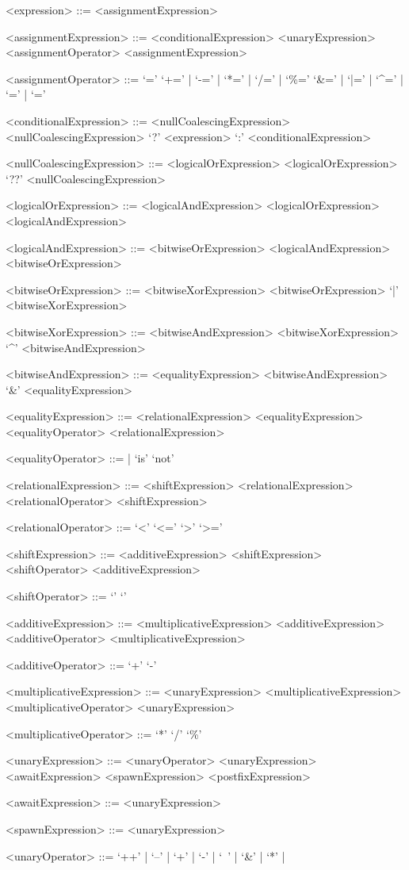 \documentclass[makeidx]{article}
\begin{document}
\begin{grammar}
<expression> ::= <assignmentExpression>

<assignmentExpression> ::= <conditionalExpression>
  \alt <unaryExpression> <assignmentOperator> <assignmentExpression>

<assignmentOperator> ::= `='
  \alt `+=' | `-=' | `*=' | `/=' | `\%='
  \alt `\&=' | `|=' | `^=' | `\ltlt=' | `\gtgt='

<conditionalExpression> ::= <nullCoalescingExpression>
  \alt <nullCoalescingExpression> `?' <expression> `:' <conditionalExpression>

<nullCoalescingExpression> ::= <logicalOrExpression>
  \alt <logicalOrExpression> `??' <nullCoalescingExpression>

<logicalOrExpression> ::= <logicalAndExpression>
  \alt <logicalOrExpression> \OR{} <logicalAndExpression>

<logicalAndExpression> ::= <bitwiseOrExpression>
  \alt <logicalAndExpression> \AND{} <bitwiseOrExpression>

<bitwiseOrExpression> ::= <bitwiseXorExpression>
  \alt <bitwiseOrExpression> `|' <bitwiseXorExpression>

<bitwiseXorExpression> ::= <bitwiseAndExpression>
  \alt <bitwiseXorExpression> `^' <bitwiseAndExpression>

<bitwiseAndExpression> ::= <equalityExpression>
  \alt <bitwiseAndExpression> `\&' <equalityExpression>

<equalityExpression> ::= <relationalExpression>
  \alt <equalityExpression> <equalityOperator> <relationalExpression>

<equalityOperator> ::= \IS{} | `is' `not'

<relationalExpression> ::= <shiftExpression>
  \alt <relationalExpression> <relationalOperator> <shiftExpression>

<relationalOperator> ::= `<'
  \alt `<='
  \alt `>'
  \alt `>='

<shiftExpression> ::= <additiveExpression>
  \alt <shiftExpression> <shiftOperator> <additiveExpression>

<shiftOperator> ::= `\ltlt'
  \alt `\gtgt'

<additiveExpression> ::= <multiplicativeExpression>
  \alt <additiveExpression> <additiveOperator> <multiplicativeExpression>

<additiveOperator> ::= `+'
  \alt `-'

<multiplicativeExpression> ::= <unaryExpression>
  \alt <multiplicativeExpression> <multiplicativeOperator> <unaryExpression>

<multiplicativeOperator> ::= `*'
  \alt `/'
  \alt `\%'

<unaryExpression> ::= <unaryOperator> <unaryExpression>
  \alt <awaitExpression>
  \alt <spawnExpression>
  \alt <postfixExpression>

<awaitExpression> ::= \AWAIT{} <unaryExpression>

<spawnExpression> ::= \SPAWN{} <unaryExpression>

<unaryOperator> ::= `++' | `--' | `+' | `-' | `~' | `\&' | `*' | \NOT{}
\end{grammar}
\end{document}
